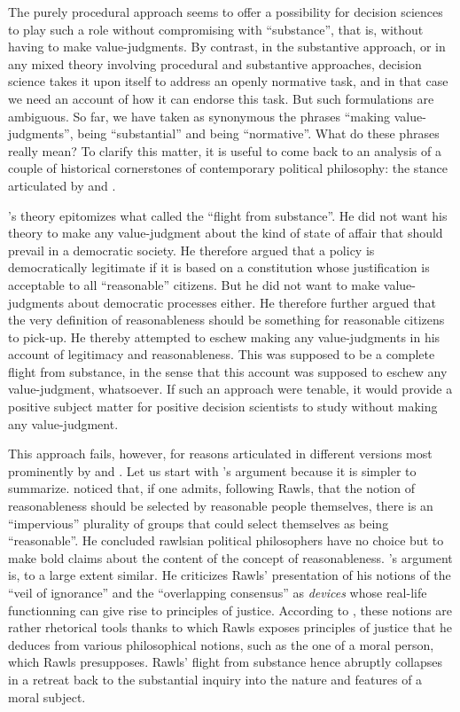 \documentclass[preprint,11pt]{elsarticle}
\begin{document}
The purely procedural approach seems to offer a possibility for decision sciences to play such a role without compromising with ``substance'', that is, without having to make value-judgments. By contrast, in the substantive approach, or in any mixed theory involving procedural and substantive approaches, decision science takes it upon itself to address an openly normative task, and in that case we need an account of how it can endorse this task.
But such formulations are ambiguous. So far, we have taken as synonymous the phrases ``making value-judgments'', being ``substantial'' and being ``normative''. What do these phrases really mean? To clarify this matter, it is useful to come back to an analysis of a couple of historical cornerstones of contemporary political philosophy: the stance articulated by \cite{rawls_political_2005} and \cite{habermas_moralbewustsein_1983}.

\cite{rawls_political_2005}'s theory epitomizes what \cite{estlund_democratic_2009} called the ``flight from substance''. He did not want his theory to make any value-judgment about the kind of state of affair that should prevail in a democratic society. He therefore argued that a policy is democratically legitimate if it is based on a constitution whose justification is acceptable to all ``reasonable'' citizens. But he did not want to make value-judgments about democratic processes either. He therefore further argued that the very definition of reasonableness should be something for reasonable citizens to pick-up. He thereby attempted to eschew making any value-judgments in his account of legitimacy and reasonableness. This was supposed to be a complete flight from substance, in the sense that this account was supposed to eschew any value-judgment, whatsoever. If such an approach were tenable, it would provide a positive subject matter for positive decision scientists to study without making any value-judgment.

This approach fails, however, for reasons articulated in different versions most prominently by \cite{habermas_reconciliation_1995} and \cite{estlund_democratic_2009}. Let us start with \cite{estlund_democratic_2009}'s argument because it is simpler to summarize. \cite{estlund_democratic_2009} noticed that, if one admits, following Rawls, that the notion of reasonableness should be selected by reasonable people themselves, there is an ``impervious'' plurality of groups that could select themselves as being ``reasonable''. He concluded rawlsian political philosophers have no choice but to make bold claims about the content of the concept of reasonableness. \cite{habermas_reconciliation_1995}'s argument is, to a large extent similar. He criticizes Rawls' presentation of his notions of the ``veil of ignorance'' and the ``overlapping consensus'' as \emph{devices} whose real-life functionning can give rise to principles of justice. According to \cite{habermas_reconciliation_1995}, these notions are rather rhetorical tools thanks to which Rawls exposes principles of justice that he deduces from various philosophical notions, such as the one of a moral person, which Rawls presupposes. Rawls' flight from substance hence abruptly collapses in a retreat back to the substantial inquiry into the nature and features of a moral subject.
\end{document}
